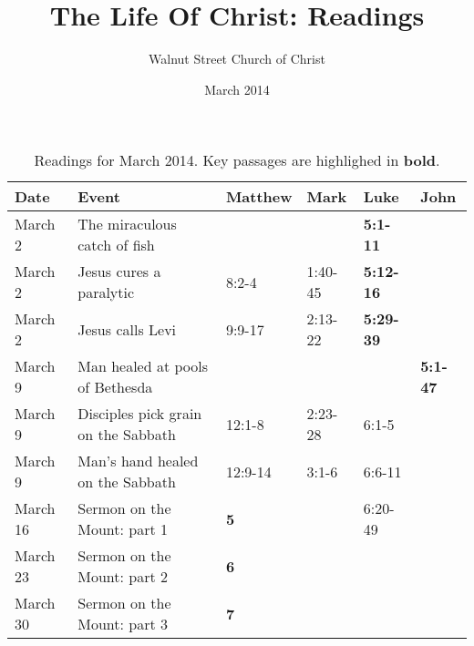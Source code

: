 \documentclass{tufte-handout}
\title{The Life Of Christ: Readings}
\author[WSCOC]{Walnut Street Church of Christ}
\date{March 2014}  %
\begin{document}
\maketitle%


\begin{table*}[ht]
  \centering
  \selectfont
  \begin{tabular}{llllll}
    \toprule
    Date & Event & Matthew & Mark & Luke & John \\
    \midrule
    \rowcolor{yellow} March 2 & The miraculous catch of fish & & & \textbf{5:1-11} & \\
    March 2 & Jesus cures a paralytic & 8:2-4 & 1:40-45 & \textbf{5:12-16} & \\
    March 2 & Jesus calls Levi & 9:9-17 & 2:13-22 & \textbf{5:29-39} & \\
    March 9 & Man healed at pools of Bethesda & & & & \textbf{5:1-47} \\
    March 9 & Disciples pick grain on the Sabbath & 12:1-8 & 2:23-28 & 6:1-5  & \\
    March 9 & Man's hand healed on the Sabbath & 12:9-14 & 3:1-6 & 6:6-11 & \\
    March 16 & Sermon on the Mount: part 1 & \textbf{5} &  & 6:20-49 & \\
    March 23 & Sermon on the Mount: part 2 & \textbf{6} & & & \\
    March 30 & Sermon on the Mount: part 3 & \textbf{7} & & & \\
    \bottomrule
  \end{tabular}
  \caption{Readings for March 2014.  Key passages are highlighed in \textbf{bold}.}
  \label{tab:readings}
\end{table*}
\end{document}

